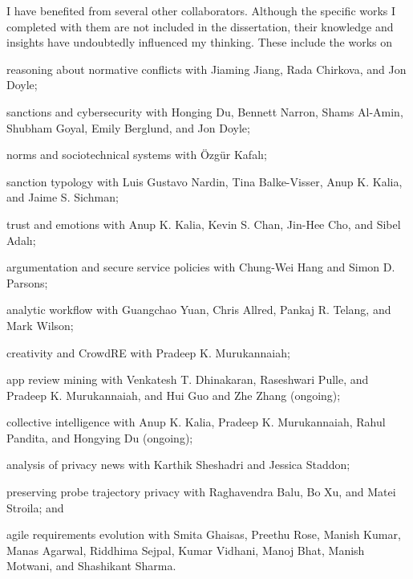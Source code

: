 \begin{acknowledgments}
I have benefited from several other collaborators. Although the
specific works I completed with them are not included in the
dissertation, their knowledge and insights have undoubtedly influenced
my thinking. These include the works on 
\begin{enumerate*}[label=(\arabic*)]
\item reasoning about normative conflicts \citep{Ajmeri-IJCAI16-Coco,Jiang-HotSoS16} with Jiaming Jiang, Rada Chirkova, and Jon Doyle; 
\item sanctions and cybersecurity \citep{Du-HotSoS15,Du-Acyse15} with Honging Du, Bennett Narron, Shams Al-Amin, Shubham Goyal, Emily Berglund, and Jon Doyle; 
\item norms and sociotechnical systems \citep{Kafali-IS16-Revani,Kafali-AAAI17-Kont} with {\"O}zg{\"u}r
Kafal{\i}; 
\item sanction typology \citep{Nardin-KER16-Classifying} with Luis Gustavo Nardin, Tina Balke-Visser, Anup K. Kalia, and Jaime S. Sichman; 
\item trust and emotions \citep{Kalia+14:Emotions} with Anup K. Kalia, Kevin S. Chan, Jin-Hee Cho, and Sibel Adal{\i};
\item argumentation and secure service policies \citep{Ajmeri-Computer17-Aragorn} with Chung-Wei Hang and Simon D. Parsons; 
\item analytic workflow \citep{Yuan-RCIS15} with Guangchao Yuan, Chris Allred, Pankaj R. Telang, and Mark Wilson; 
\item creativity and CrowdRE \citep{Murukannaiah-RE16-Creative,Murukannaiah-RE17-Data} with Pradeep K. Murukannaiah;
\item app review mining \citep{Dhinakaran-RE18-ActiveAppReview} with Venkatesh T. Dhinakaran, Raseshwari Pulle, and Pradeep K. Murukannaiah, and Hui Guo and Zhe Zhang (ongoing);
\item collective intelligence with Anup K. Kalia, Pradeep K. Murukannaiah, Rahul Pandita, and Hongying Du (ongoing);
\item analysis of privacy news \citep{Sheshadri-PST17-News} with Karthik Sheshadri and Jessica Staddon;
\item preserving probe trajectory privacy with Raghavendra Balu, Bo Xu, and Matei Stroila; and
\item agile requirements evolution \citep{Daneva-2013-AgileReqPrioritization,Ghaisas-2013-KRE} with Smita Ghaisas, Preethu Rose, Manish Kumar, Manas Agarwal, Riddhima Sejpal, Kumar Vidhani, Manoj Bhat, Manish Motwani, and Shashikant Sharma.
\end{enumerate*}


\end{acknowledgments}
